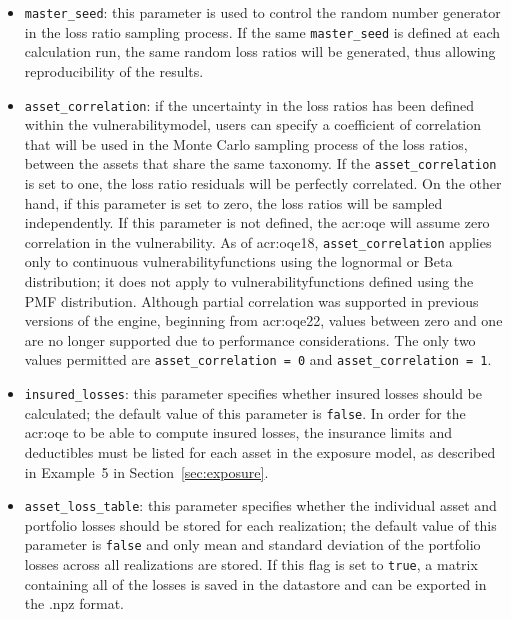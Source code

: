 \begin{itemize}

  \item \Verb+master_seed+: this parameter is used to control the random
    number generator in the loss ratio sampling process. If the same
    \Verb+master_seed+ is defined at each calculation run, the same random loss
    ratios will be generated, thus allowing reproducibility of the results.

  \item \Verb+asset_correlation+: if the uncertainty in the loss ratios
    has been defined within the \gls{vulnerabilitymodel}, users can specify
    a coefficient of correlation that will be used in the Monte Carlo sampling
    process of the loss ratios, between the assets that share the same
    \gls{taxonomy}. If the \Verb+asset_correlation+ is set to one,
    the loss ratio residuals will be perfectly correlated. On the other hand,
    if this parameter is set to zero, the loss ratios will be sampled
    independently. If this parameter is not defined, the
    \glsdesc{acr:oqe} will assume zero correlation in the vulnerability. As of
    \glsdesc{acr:oqe18}, \Verb+asset_correlation+ applies only to continuous
    \glspl{vulnerabilityfunction} using the lognormal or Beta distribution; 
    it does not apply to \glspl{vulnerabilityfunction} defined using the PMF
    distribution. Although partial correlation was supported in previous
    versions of the engine, beginning from \glsdesc{acr:oqe22}, values between
    zero and one are no longer supported due to performance considerations. The
    only two values permitted are \Verb+asset_correlation = 0+ and 
    \Verb+asset_correlation = 1+.

  \item \Verb+insured_losses+: this parameter specifies whether insured losses
    should be calculated; the default value of this parameter is \Verb+false+.
    In order for the \glsdesc{acr:oqe} to be able to compute insured losses, the
    insurance limits and deductibles must be listed for each asset in the 
    exposure model, as described in Example~5 in Section~\ref{sec:exposure}.

  \item \Verb+asset_loss_table+: this parameter
    specifies whether the individual asset and portfolio losses should be
    stored for each realization; the default value of this parameter is
    \Verb+false+ and only mean and standard deviation of the portfolio losses
    across all realizations are stored. If this flag is set to \Verb+true+, a
    matrix containing all of the losses is saved in the datastore and can be
    exported in the .npz format.

\end{itemize}

